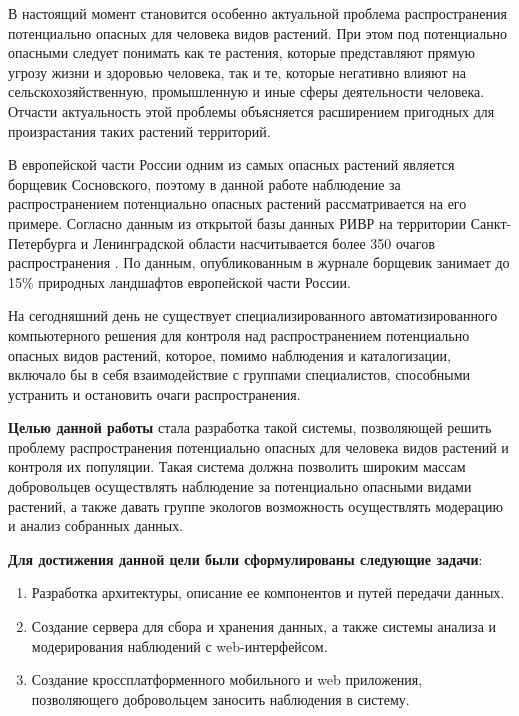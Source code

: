 

\tab
В настоящий момент становится особенно актуальной проблема распространения потенциально опасных для человека видов растений.
При этом под потенциально опасными следует понимать как те растения, которые представляют прямую угрозу жизни и здоровью человека, так и те, которые негативно влияют на сельскохозяйственную, промышленную и иные сферы деятельности человека\cite{alien-plants}.
Отчасти актуальность этой проблемы объясняется расширением пригодных для произрастания таких растений территорий\cite{invasive-plants}.

\nwln
В европейской части России одним из самых опасных растений является борщевик Сосновского\cite{heracleum}, поэтому в данной работе наблюдение за распространением потенциально опасных растений рассматривается на его примере.
Согласно данным из открытой базы данных РИВР\cite{rivr} на территории Санкт-Петербурга и Ленинградской области насчитывается более 350 очагов распространения .
По данным, опубликованным в журнале \cite{esquire} борщевик занимает до 15\% природных ландшафтов европейской части России.

\nwln
На сегодняшний день не существует специализированного автоматизированного компьютерного решения для контроля над распространением потенциально опасных видов растений, которое, помимо наблюдения и каталогизации, включало бы в себя взаимодействие с группами специалистов, способными устранить и остановить очаги распространения.

\nwln
\textbf{Целью данной работы} стала разработка такой системы, позволяющей решить проблему распространения потенциально опасных для человека видов растений и контроля их популяции.
Такая система должна позволить широким массам добровольцев осуществлять наблюдение за потенциально опасными видами растений, а также давать группе экологов возможность осуществлять модерацию и анализ собранных данных.

\nwln
\textbf{Для достижения данной цели были сформулированы следующие задачи}:
\begin{enumerate}[topsep=0pt, parsep=0pt, itemsep=0pt, leftmargin=*, labelindent=0.5cm]
	\item Разработка архитектуры, описание ее компонентов и путей передачи данных.
	\item Создание сервера для сбора и хранения данных, а также системы анализа и модерирования наблюдений с web-интерфейсом.
	\item Создание кроссплатформенного мобильного и web приложения, позволяющего добровольцем заносить наблюдения в систему.
\end{enumerate}

